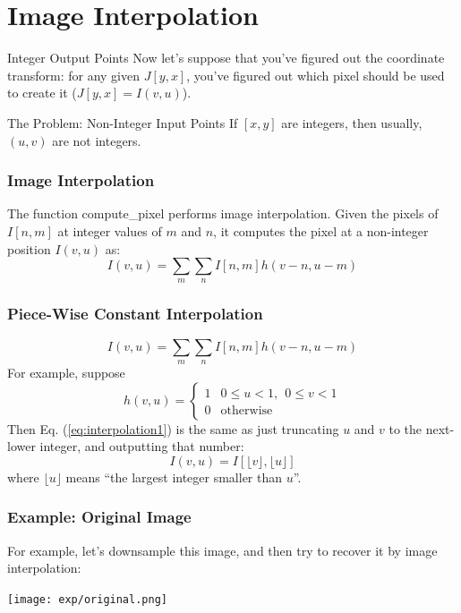 \documentclass{beamer}
\begin{document}
\section{Image Interpolation}
\setcounter{subsection}{1}

\begin{frame}
  \begin{block}{Integer Output Points}
    Now let's suppose that you've figured out the coordinate transform:
    for any given $J[y,x]$, you've figured out which pixel should be used to create it 
    ($J[y,x]=I(v,u)$).
    
  \end{block}
  \begin{block}{The Problem: Non-Integer Input Points}
    If $[x,y]$ are integers, then usually, $(u,v)$ are not integers.
  \end{block}
\end{frame}

\begin{frame}
  \frametitle{Image Interpolation}
  The function compute\_pixel performs image interpolation.
  Given the pixels of $I[n,m]$ at integer values of $m$ and $n$, it computes
  the pixel at a non-integer position $I(v,u)$ as:
  \[
  I(v,u) = \sum_m\sum_n I[n,m] h(v-n,u-m)
  \]
\end{frame}

\begin{frame}
  \frametitle{Piece-Wise Constant Interpolation}
  \begin{equation}
  I(v,u) = \sum_m\sum_n I[n,m] h(v-n,u-m)
  \label{eq:interpolation1}
  \end{equation}
  For example, suppose
  \[
  h(v,u) = \left\{\begin{array}{ll}
  1 & 0\le u<1,~~0\le v<1\\
  0 & \mbox{otherwise}
  \end{array}\right.
  \]
  Then Eq. (\ref{eq:interpolation1}) is the same as just truncating $u$
  and $v$ to the next-lower integer, and outputting that number:
  \[
  I(v,u) = I\left[\lfloor v\rfloor,\lfloor u\rfloor\right]
  \]
  where $\lfloor u\rfloor$ means ``the largest integer smaller than $u$''.
\end{frame}

\begin{frame}
  \frametitle{Example: Original Image}
  For example, let's downsample this image, and then try to recover it by image interpolation:
  \centerline{\texttt{[image: exp/original.png]}}
\end{frame}
\end{document}
